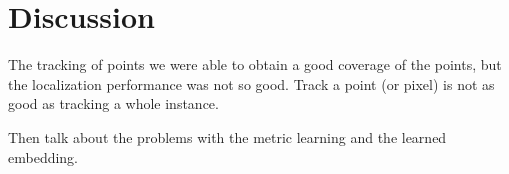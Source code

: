 
%
\newpage
\chapter{Discussion}




The tracking of points we were able to obtain a good coverage of the points, but the localization performance was not so good. Track a point (or pixel) is not as good as tracking a whole instance.

Then talk about the problems with the metric learning and the learned embedding.
